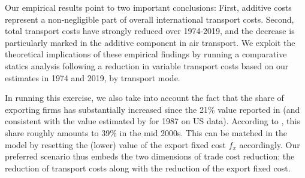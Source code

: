 \documentclass[a4paper,11pt]{article}
\begin{document}
Our empirical results point to two important conclusions: First, additive costs represent a non-negligible part of overall international transport costs. Second, total transport costs have strongly reduced over 1974-2019, and the decrease is particularly marked in the additive component in air transport. We exploit the theoretical implications of these empirical findings by running a comparative statics analysis following a reduction in variable transport costs based on our estimates in 1974 and 2019, by transport mode.

In running this exercise, we also take into account the fact that the share of exporting firms has substantially increased since the 21\% value reported in \cite{BEJK-AER-03} (and consistent with the value estimated by \citet{Lincoln_McCallum2018} for 1987 on US data). According to \cite{Lincoln_McCallum2018}, this share roughly amounts to 39\% in the mid 2000s. This can be matched in the model by resetting the (lower) value of the export fixed cost $f_x$ accordingly. Our preferred scenario thus embeds the two dimensions of trade cost reduction: the reduction of transport costs along with the reduction of the export fixed cost.
\end{document}
